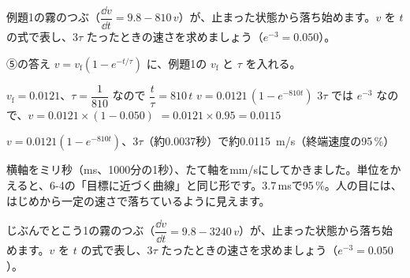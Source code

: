 \begin{reidai}[速さの式を求める]
例題1の霧のつぶ（$\dfrac{\dd v}{\dd t}=9.8-810\,v$）が、止まった状態から落ち始めます。$v$ を $t$ の式で表し、$3\tau$ たったときの速さを求めましょう（$e^{-3}=0.050$）。\par
\kangaekata ⑤の答え $v=v_{\mathrm f}(1-e^{-t/\tau})$ に、例題1の $v_{\mathrm f}$ と $\tau$ を入れる。\par
\shiki $v_{\mathrm f}=0.0121$、$\tau=\dfrac{1}{810}$ なので $\dfrac{t}{\tau}=810\,t$\bkvifq
$v=0.0121\,(1-e^{-810t})$\bkvifq
$3\tau$ では $e^{-3}$ なので、$v=0.0121\times(1-0.050)$\bkvifq
\hspace*{3\zw}$=0.0121\times0.95=0.0115$\par
\kotae $v=0.0121(1-e^{-810t})$、$3\tau$（約0.0037秒）で約\qty{0.0115}{m/s}（終端速度の95\,\%）
\end{reidai}
\noindent\begin{minipage}[c]{0.5\linewidth}
\end{minipage}\hfill
\begin{minipage}[c]{0.46\linewidth}\raggedright
横軸をミリ秒（ms、1000分の1秒）、たて軸をmm/sにしてかきました。単位をかえると、6-4の「目標に近づく曲線」と同じ形です。3.7\,msで95\,\%。人の目には、はじめから一定の速さで落ちているように見えます。
\end{minipage}
\par\vspace{4pt}

\begin{jibun}
じぶんでとこう1の霧のつぶ（$\dfrac{\dd v}{\dd t}=9.8-3240\,v$）が、止まった状態から落ち始めます。$v$ を $t$ の式で表し、$3\tau$ たったときの速さを求めましょう（$e^{-3}=0.050$）。
\end{jibun}

